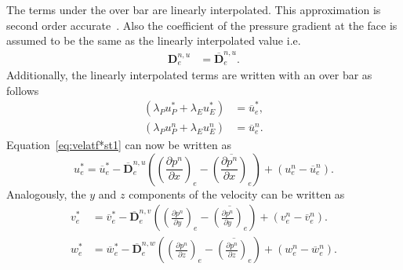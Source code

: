 The terms under the over bar are linearly interpolated. This approximation is second order accurate~\cite{Moukalled}. Also the coefficient of the pressure gradient at the face is assumed to be the same as the linearly interpolated value i.e. 
\begin{align*}
\boldsymbol{D}_{e}^{n,u} &= \overline{\boldsymbol{D}}_{e}^{n,u}.
\end{align*}
Additionally, the linearly interpolated terms are written with an over bar as follows
\begin{align*}
(\lambda_P u_{P}^{\ast} + \lambda_E u_{E}^{\ast}) &= \overline{u}_{e}^{\ast}, \\
(\lambda_P u_{P}^{n} + \lambda_E u_{E}^{n}) &= \overline{u}_{e}^{n}.
\end{align*}
Equation~\ref{eq:velatf*st1} can now be written as
\begin{equation}
u_{e}^{\ast}=\overline{u}_{e}^{\ast}-\overline{\boldsymbol{D}}_{e}^{n,u}\left(\left(\frac{\partial p^n}{\partial x}\right)_{e}-\overline{\left(\frac{\partial p^n}{\partial x}\right)_{e}}\right) + \left(u_{e}^n - \overline{u}_{e}^n\right).
\label{eq:uvelatf*}
\end{equation}
Analogously, the $y$ and $z$ components of the velocity can be written as
\begin{align}
v_{e}^{\ast}&=\overline{v}_{e}^{\ast}-\overline{\boldsymbol{D}}_{e}^{n,v}\left(\left(\frac{\partial p^n}{\partial y}\right)_{e}-\overline{\left(\frac{\partial p^n}{\partial y}\right)_{e}}\right) + \left(v_{e}^n - \overline{v}_{e}^n\right).
\label{eq:vvelatf*}\\
w_{e}^{\ast}&=\overline{w}_{e}^{\ast}-\overline{\boldsymbol{D}}_{e}^{n,w}\left(\left(\frac{\partial p^n}{\partial z}\right)_{e}-\overline{\left(\frac{\partial p^n}{\partial z}\right)_{e}}\right) + \left(w_{e}^n - \overline{w}_{e}^n\right).
\label{eq:wvelatf*}
\end{align}

